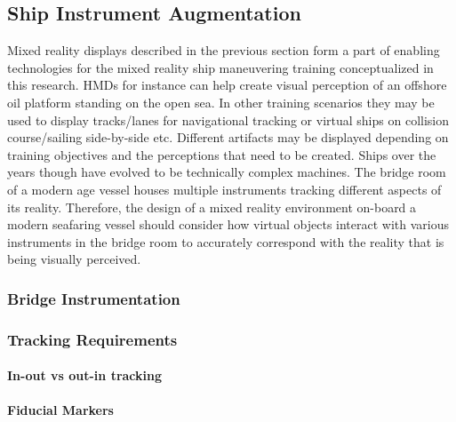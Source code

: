 \subsection{Ship Instrument Augmentation}

Mixed reality displays described in the previous section form a part of enabling technologies for the mixed reality ship maneuvering training conceptualized in this research. HMDs for instance can help create visual perception of an offshore oil platform standing on the open sea. In other training scenarios they may be used to display tracks/lanes for navigational tracking or virtual ships on collision course/sailing side-by-side etc. Different artifacts may be displayed depending on training objectives and the perceptions that need to be created. Ships over the years though have evolved to be technically complex machines. The bridge room of a modern age vessel houses multiple instruments tracking different aspects of its reality. Therefore, the design of a mixed reality environment on-board a modern seafaring vessel should consider how virtual objects interact with various instruments in the bridge room to accurately correspond with the reality that is being visually perceived.  

\subsubsection{Bridge Instrumentation}



\subsubsection{Tracking Requirements}

\paragraph{In-out vs out-in tracking}

\paragraph{Fiducial Markers}

